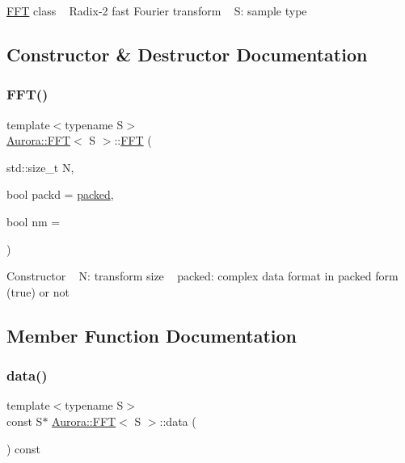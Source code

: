 \hyperlink{class_aurora_1_1_f_f_t}{F\+FT} class ~\newline
Radix-\/2 fast Fourier transform ~\newline
S\+: sample type 

\subsection{Constructor \& Destructor Documentation}
\mbox{\label{class_aurora_1_1_f_f_t_ab96506ecc02bbba26403e0a8def83f8d}} 
\subsubsection{\texorpdfstring{F\+F\+T()}{FFT()}}
{\footnotesize\ttfamily template$<$typename S$>$ \\
\hyperlink{class_aurora_1_1_f_f_t}{Aurora\+::\+F\+FT}$<$ S $>$\+::\hyperlink{class_aurora_1_1_f_f_t}{F\+FT} (\begin{DoxyParamCaption}\item[{std\+::size\+\_\+t}]{N,  }\item[{bool}]{packd = {\ttfamily \hyperlink{namespace_aurora_a3e70ffc9ea5c526dcd66b1b14e43f175}{packed}},  }\item[{bool}]{nm = {} }\end{DoxyParamCaption})\hspace{0.3cm}{\ttfamily [inline]}}

Constructor ~\newline
N\+: transform size ~\newline
packed\+: complex data format in packed form (true) or not 

\subsection{Member Function Documentation}
\mbox{\label{class_aurora_1_1_f_f_t_a7462e77c06228475f0f491d7a25d7bba}} 
\subsubsection{\texorpdfstring{data()}{data()}}
{\footnotesize\ttfamily template$<$typename S$>$ \\
const S$\ast$ \hyperlink{class_aurora_1_1_f_f_t}{Aurora\+::\+F\+FT}$<$ S $>$\+::data (\begin{DoxyParamCaption}{ }\end{DoxyParamCaption}) const\hspace{0.3cm}{\ttfamily [inline]}}

